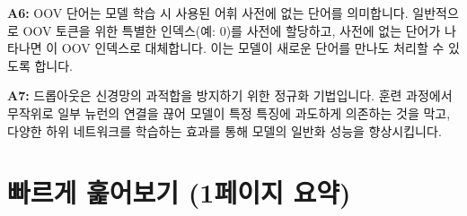 \documentclass[11pt,a4paper]{article}
\begin{document}
\begin{tcolorbox}[title=\textbf{Q6: OOV(Out-Of-Vocabulary) 단어는 어떻게 처리하나요?}, colback=myyellow!5!white, colframe=myyellow!75!black]
\textbf{A6:} OOV 단어는 모델 학습 시 사용된 어휘 사전에 없는 단어를 의미합니다. 일반적으로 OOV 토큰을 위한 특별한 인덱스(예: 0)를 사전에 할당하고, 사전에 없는 단어가 나타나면 이 OOV 인덱스로 대체합니다. 이는 모델이 새로운 단어를 만나도 처리할 수 있도록 합니다.
\end{tcolorbox}

\begin{tcolorbox}[title=\textbf{Q7: 드롭아웃(Dropout)은 왜 사용하나요?}, colback=myyellow!5!white, colframe=myyellow!75!black]
\textbf{A7:} 드롭아웃은 신경망의 과적합을 방지하기 위한 정규화 기법입니다. 훈련 과정에서 무작위로 일부 뉴런의 연결을 끊어 모델이 특정 특징에 과도하게 의존하는 것을 막고, 다양한 하위 네트워크를 학습하는 효과를 통해 모델의 일반화 성능을 향상시킵니다.
\end{tcolorbox}

\newpage
\section*{빠르게 훑어보기 (1페이지 요약)}
\end{document}
